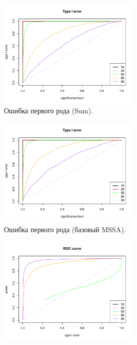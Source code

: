 \documentclass[specialist,
substylefile = spbu_report.rtx,
subf,href,colorlinks=true, 12pt]{disser}
\theoremstyle{definition}
\begin{document}
	\begin{figure}
		\captionsetup[subfigure]{justification=Centering}
		\begin{subfigure}[t]{0.45\textwidth}
			\centering
			\includegraphics[width=0.75\textwidth]{type1error_sum_fa.pdf}
			\caption{Ошибка первого рода (Sum).}
			\label{fig:sum_fa_a}
		\end{subfigure}\hspace{\fill}
		\begin{subfigure}[t]{0.45\textwidth}
			\centering
			\includegraphics[width=0.75\textwidth]{type1error_mssa_fa.pdf}
			\caption{Ошибка первого рода (базовый MSSA).}
		\end{subfigure}
		\bigskip
		\begin{subfigure}[t]{0.45\textwidth}
			\centering
			\includegraphics[width=0.75\textwidth]{roc_sum_fa.pdf}

\end{subfigure}
\end{figure}
\end{document}
